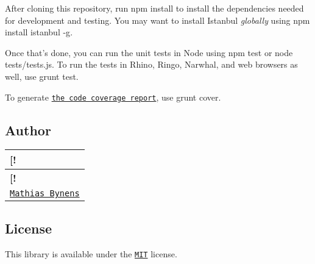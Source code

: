 After cloning this repository, run {\ttfamily npm install} to install the dependencies needed for development and testing. You may want to install Istanbul {\itshape globally} using {\ttfamily npm install istanbul -\/g}.

Once that’s done, you can run the unit tests in Node using {\ttfamily npm test} or {\ttfamily node tests/tests.\+js}. To run the tests in Rhino, Ringo, Narwhal, and web browsers as well, use {\ttfamily grunt test}.

To generate \href{http://rawgithub.com/mathiasbynens/cssesc/master/coverage/cssesc/cssesc.js.html}{\tt the code coverage report}, use {\ttfamily grunt cover}.

\subsection*{Author}

\tabulinesep=1mm
\begin{longtabu} spread 0pt [c]{*{1}{|X[-1]}|}
\hline
\rowcolor{\tableheadbgcolor}\textbf{ \mbox{[}!   }\\
\endfirsthead
\hline
\endfoot
\hline
\rowcolor{\tableheadbgcolor}\textbf{ \mbox{[}!   }\\
\endhead
\href{http://mathiasbynens.be/}{\tt Mathias Bynens}   \\
\end{longtabu}


\subsection*{License}

This library is available under the \href{http://mths.be/mit}{\tt M\+IT} license. 